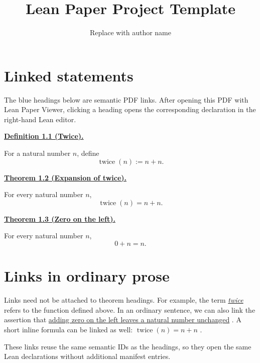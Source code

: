 \documentclass[11pt]{article}
\title{Lean Paper Project Template}
\author{Replace with author name}
\date{}
\newcommand{\leanlink}[2]{%
  \href{lean-paper:#1}{#2}%
}
\newenvironment{leanstatement}[2]{%
  \par\medskip\noindent
  \leanlink{#1}{\textbf{#2}}%
  \quad\itshape
}{%
  \par\medskip
}
\begin{document}
\maketitle

\section{Linked statements}

The blue headings below are semantic PDF links. After opening this PDF with
Lean Paper Viewer, clicking a heading opens the corresponding declaration in
the right-hand Lean editor.

\begin{leanstatement}{def:twice}{Definition 1.1 (Twice).}
For a natural number $n$, define
\[
  \operatorname{twice}(n) := n+n.
\]
\end{leanstatement}

\begin{leanstatement}{thm:twice-eq-add-self}{Theorem 1.2 (Expansion of twice).}
For every natural number $n$,
\[
  \operatorname{twice}(n)=n+n.
\]
\end{leanstatement}

\begin{leanstatement}{thm:zero-add}{Theorem 1.3 (Zero on the left).}
For every natural number $n$,
\[
  0+n=n.
\]
\end{leanstatement}

\section{Links in ordinary prose}

Links need not be attached to theorem headings. For example, the term
\leanlink{def:twice}{\emph{twice}} refers to the function defined above.
In an ordinary sentence, we can also link the assertion that
\leanlink{thm:zero-add}{adding zero on the left leaves a natural number unchanged}.
A short inline formula can be linked as well:
\leanlink{thm:twice-eq-add-self}{\(\operatorname{twice}(n)=n+n\)}.

These links reuse the same semantic IDs as the headings, so they open the
same Lean declarations without additional manifest entries.
\end{document}
